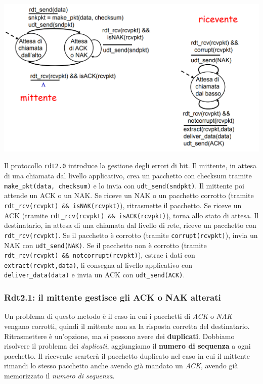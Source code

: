 \begin{center}
\includegraphics[width=\textwidth]{./img/rdt2.0.png}
\end{center}

Il protocollo \texttt{rdt2.0} introduce la gestione degli errori di bit. Il mittente, in attesa di una chiamata dal livello applicativo, crea un pacchetto con checksum tramite \texttt{make\_pkt(data, checksum)} e lo invia con \texttt{udt\_send(sndpkt)}. Il mittente poi attende un ACK o un NAK. Se riceve un NAK o un pacchetto corrotto (tramite \texttt{rdt\_rcv(rcvpkt) \&\& isNAK(rcvpkt)}), ritrasmette il pacchetto. Se riceve un ACK (tramite \texttt{rdt\_rcv(rcvpkt) \&\& isACK(rcvpkt)}), torna allo stato di attesa. Il destinatario, in attesa di una chiamata dal livello di rete, riceve un pacchetto con \texttt{rdt\_rcv(rcvpkt)}. Se il pacchetto è corrotto (tramite \texttt{corrupt(rcvpkt)}), invia un NAK con \texttt{udt\_send(NAK)}. Se il pacchetto non è corrotto (tramite \texttt{rdt\_rcv(rcvpkt) \&\& notcorrupt(rcvpkt)}), estrae i dati con \texttt{extract(rcvpkt,data)}, li consegna al livello applicativo con \texttt{deliver\_data(data)} e invia un ACK con \texttt{udt\_send(ACK)}.

\subsubsection*{Rdt2.1: il mittente gestisce gli ACK o NAK alterati}
Un problema di questo metodo è il caso in cui i pacchetti di \textit{ACK} o \textit{NAK} vengano corrotti, quindi il mittente non sa la risposta corretta del destinatario. Ritrasmettere è un'opzione, ma si possono avere dei \textbf{duplicati}.
Dobbiamo risolvere il problema dei \textit{duplicati}, aggiungiamo il \textbf{numero di sequenza} a ogni pacchetto. Il ricevente scarterà il pacchetto duplicato nel caso in cui il mittente rimandi lo stesso pacchetto anche avendo già mandato un \textit{ACK}, avendo già memorizzato il \textit{numero di sequenza}.


